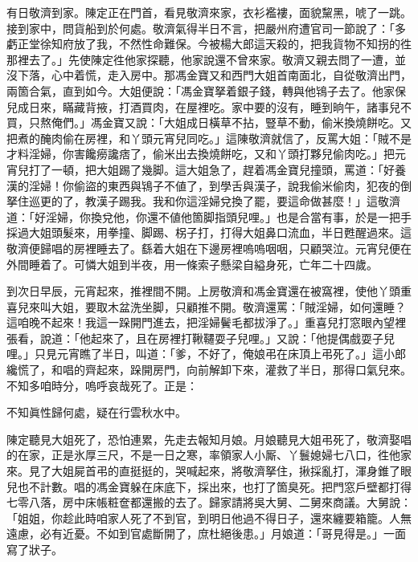 有日敬濟到家。陳定正在門首，看見敬濟來家，衣衫襤褸，面貌黧黑，唬了一跳。接到家中，問貨船到於何處。敬濟氣得半日不言，把嚴州府遭官司一節說了：「多虧正堂徐知府放了我，不然性命難保。{}今被楊大郎這天殺的，把我貨物不知拐的徃那裡去了。」先使陳定徃他家探聽，他家說還不曾來家。敬濟又親去問了一遭，並沒下落，心中着慌，走入房中。那馮金寶又和西門大姐首南面北，自從敬濟出門，兩箇合氣，直到如今。大姐便說：「馮金寶拏着銀子錢，轉與他鴇子去了。他家保兒成日來，瞞藏背掖，打酒買肉，在屋裡吃。家中要的沒有，睡到晌午，諸事兒不買，只熬俺們。」馮金寶又說：「大姐成日橫草不拈，豎草不動，偷米換燒餅吃。又把煮的醃肉偷在房裡，和丫頭元宵兒同吃。」這陳敬濟就信了，{}反罵大姐：「賊不是才料淫婦，你害饞癆讒痞了，偷米出去換燒餅吃，又和丫頭打夥兒偷肉吃。」把元宵兒打了一頓，把大姐踢了幾脚。這大姐急了，趕着馮金寶兒撞頭，罵道：「好養漢的淫婦！你偷盜的東西與鴇子不値了，到學舌與漢子，說我偷米偷肉，犯夜的倒拏住巡更的了，教漢子踢我。我和你這淫婦兌換了罷，要這命做甚麼！」這敬濟道：「好淫婦，你換兌他，你還不値他箇脚指頭兒哩。」也是合當有事，於是一把手採過大姐頭髮來，用拳撞、脚踢、柺子打，打得大姐鼻口流血，半日甦醒過來。這敬濟便歸唱的房裡睡去了。繇着大姐在下邊房裡嗚嗚咽咽，只顧哭泣。{}元宵兒便在外間睡着了。可憐大姐到半夜，用一條索子懸梁自縊身死，亡年二十四歲。

到次日早辰，元宵起來，推裡間不開。上房敬濟和馮金寶還在被窩裡，使他丫頭重喜兒來叫大姐，要取木盆洗坐脚，只顧推不開。敬濟還罵：「賊淫婦，如何還睡？這咱晚不起來！我這一跺開門進去，把淫婦鬢毛都拔淨了。」重喜兒打窓眼內望裡張看，說道：「他起來了，且在房裡打鞦韆耍子兒哩。」又說：「他提偶戲耍子兒哩。」只見元宵瞧了半日，叫道：「爹，不好了，俺娘弔在床頂上弔死了。」這小郎纔慌了，和唱的齊起來，跺開房門，向前解卸下來，灌救了半日，那得口氣兒來。不知多咱時分，嗚呼哀哉死了。正是：

\begin{myquote}
不知眞性歸何處，疑在行雲秋水中。
\end{myquote}

陳定聽見大姐死了，恐怕連累，先走去報知月娘。{}月娘聽見大姐弔死了，敬濟娶唱的在家，正是氷厚三尺，不是一日之寒，率領家人小厮、丫鬟媳婦七八口，徃他家來。見了大姐屍首弔的直挺挺的，哭喊起來，將敬濟拏住，揪採亂打，渾身錐了眼兒也不計數。{}唱的馮金寶躲在床底下，採出來，也打了箇臭死。把門窓戶壁都打得七零八落，房中床帳粧奩都還搬的去了。歸家請將吳大舅、二舅來商議。大舅說：「姐姐，你趁此時咱家人死了不到官，到明日他過不得日子，還來纏要箱籠。人無遠慮，必有近憂。不如到官處斷開了，庶杜絕後患。」{}月娘道：「哥見得是。」一面寫了狀子。

